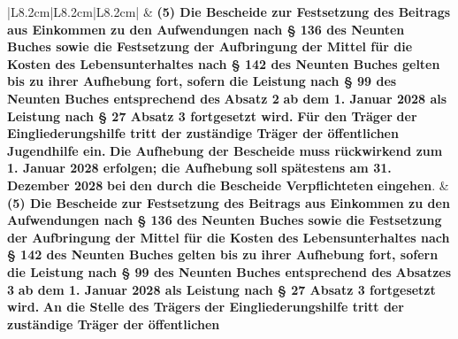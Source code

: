 \documentclass[10pt,a4paper,landscape]{article}
\begin{document}
\begin{longtable}{|L{8.2cm}|L{8.2cm}|L{8.2cm}|}
 & \textbf{(5) Die Bescheide zur Festsetzung des  \newline Beitrags aus Einkommen zu den  \newline Aufwendungen nach \S{} 136 des Neunten  \newline Buches sowie die Festsetzung der  \newline Aufbringung der Mittel für die Kosten  \newline des Lebensunterhaltes nach \S{} 142 des  \newline Neunten Buches gelten bis zu ihrer  \newline Aufhebung fort, sofern die Leistung  \newline nach \S{} 99 des Neunten Buches  \newline entsprechend des }\textbf{\textcolor{diffred}{Absatz 2}}\textbf{ ab dem 1.  \newline Januar 2028 als Leistung nach \S{} 27  \newline Absatz 3 fortgesetzt wird. }\textbf{\textcolor{diffred}{Für den  \newline Träger}}\textbf{ der Eingliederungshilfe tritt der  \newline zuständige Träger der öffentlichen} \newline \textbf{\textcolor{diffred}{Jugendhilfe ein.}}\textbf{ Die Aufhebung der  \newline Bescheide muss rückwirkend zum 1.  \newline Januar 2028 erfolgen; die Aufhebung} \newline \textbf{\textcolor{diffred}{soll}}\textbf{ spätestens am 31. Dezember 2028} \newline \textbf{\textcolor{diffred}{bei}}\textbf{ den durch die Bescheide  \newline Verpflichteten }\textbf{\textcolor{diffred}{eingehen}}\textcolor{diffred}{.} & \textbf{(5) Die Bescheide zur Festsetzung des  \newline Beitrags aus Einkommen zu den } \textbf{Aufwendungen nach \S{} 136 des Neunten  \newline Buches sowie die Festsetzung der  \newline Aufbringung der Mittel für die Kosten  \newline des Lebensunterhaltes nach \S{} 142 des  \newline Neunten Buches gelten bis zu ihrer  \newline Aufhebung fort, sofern die Leistung  \newline nach \S{} 99 des Neunten Buches  \newline entsprechend des }\textbf{\textcolor{diffgreen}{Absatzes 3}}\textbf{ ab dem 1.  \newline Januar 2028 als Leistung nach \S{} 27  \newline Absatz 3 fortgesetzt wird. }\textbf{\textcolor{diffgreen}{An die Stelle  \newline des Trägers}}\textbf{ der Eingliederungshilfe tritt  \newline der zuständige Träger der öffentlichen} \newline 
\end{longtable}
\end{document}
